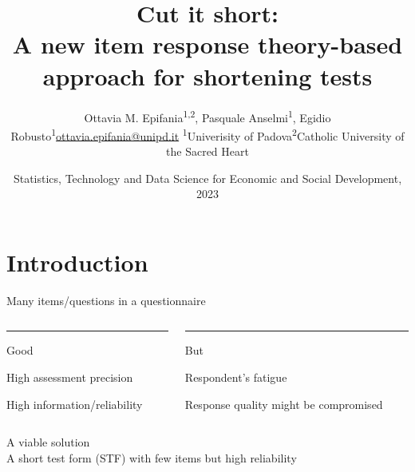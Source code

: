 \documentclass{beamer} %
\title[Cut it short]{Cut it short: \\ A new item response theory-based approach for shortening tests}
\date[ASA 2023]{Statistics, Technology and Data Science for Economic and Social Development, 2023}
\institute[]{September 7\textsuperscript{th}, Bologna (IT)}
\author[O.M.E., P.A., E.R.]{\texorpdfstring{Ottavia M. Epifania\textsuperscript{1,2}, Pasquale Anselmi\textsuperscript{1}, Egidio Robusto\textsuperscript{1}\newline\url{ottavia.epifania@unipd.it} \newline \textsuperscript{1}Univerisity of  Padova\newline\textsuperscript{2}Catholic University of the Sacred Heart}{Author}}
\begin{document}
	
\begin{frame}[plain]
	\maketitle
\end{frame}

\section[Intro]{Introduction}

\begin{frame}
	\begin{center}
	\Large	Many items/questions in a questionnaire 
\end{center}
\vspace{5mm}
\begin{columns}[T] %
	\begin{column}{.50\textwidth}
		\color{myGreen}\rule{\linewidth}{4pt}
		\begin{center}
			\large{Good}
		\end{center}
		\normalcolor
		
		High assessment precision
		
		
		\vspace{1.8mm}
		
		High information/reliability 
		
	\end{column}%
	\hfill%
	\begin{column}{.50\textwidth}
		
		\color{but}\rule{\linewidth}{4pt}
		\begin{center}
			\large{But}
		\end{center}
		\normalcolor
		
		Respondent's fatigue
		
		\vspace{1.8mm}
		
		Response quality might be compromised
		\end{column}%
\end{columns}  

\vspace{5mm}
\begin{center}
	\color{template} A viable solution \\
	\normalcolor 
	A short test form (STF) with few items but high reliability 
\end{center}

\end{frame}
\end{document}
